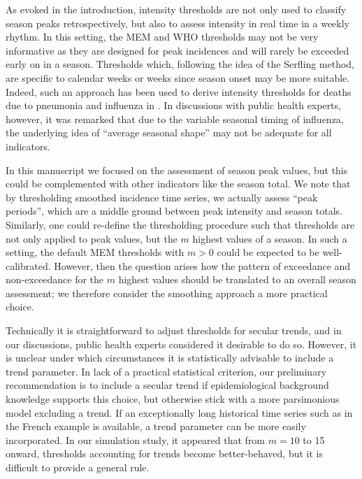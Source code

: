\documentclass[12pt]{article}
\begin{document}
As evoked in the introduction, intensity thresholds are not only used to classify season peaks retrospectively, but also to assess intensity in real time in a weekly rhythm. In this setting, the MEM and WHO thresholds may not be very informative as they are designed for peak incidences and will rarely be exceeded early on in a season. Thresholds which, following the idea of the Serfling method, are specific to calendar weeks or weeks since season onset may be more suitable. Indeed, such an approach has been used to derive intensity thresholds for deaths due to pneumonia and influenza in \cite{Biggerstaff2017}. In discussions with public health experts, however, it was remarked that due to the variable seasonal timing of influenza, the underlying idea of ``average seasonal shape'' may not be adequate for all indicators. %

In this manuscript we focused on the assessment of season peak values, but this could be complemented with other indicators like the season total. We note that by thresholding smoothed incidence time series, we actually assess ``peak periods'', which are a middle ground between peak intensity and season totals. Similarly, one could re-define the thresholding procedure such that thresholds are not only applied to peak values, but the $m$ highest values of a season. In such a setting, the default MEM thresholds with $m > 0$ could be expected to be well-calibrated. However, then the question arises how the pattern of exceedance and non-exceedance for the $m$ highest values should be translated to an overall season assessment; we therefore consider the smoothing approach a more practical choice. 

Technically it is straightforward to adjust thresholds for secular trends, and in our discussions, public health experts considered it desirable to do so. However, it is unclear under which circumstances it is statistically advisable to include a trend parameter. In lack of a practical statistical criterion, our preliminary recommendation is to include a secular trend if epidemiological background knowledge supports this choice, but otherwise stick with a more parsimonious model excluding a trend. If an exceptionally long historical time series such as in the French example is available, a trend parameter can be more easily incorporated. In our simulation study, it appeared that from $m = 10$ to 15 onward, thresholds accounting for trends become better-behaved, but it is difficult to provide a general rule.
\end{document}

